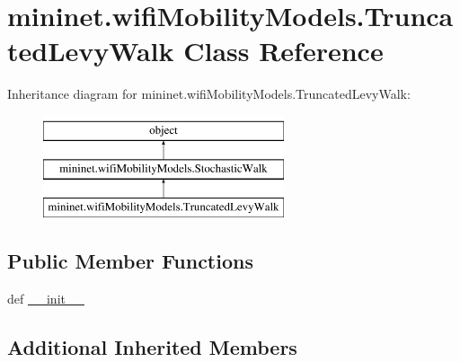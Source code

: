 \hypertarget{classmininet_1_1wifiMobilityModels_1_1TruncatedLevyWalk}{\section{mininet.\-wifi\-Mobility\-Models.\-Truncated\-Levy\-Walk Class Reference}
\label{classmininet_1_1wifiMobilityModels_1_1TruncatedLevyWalk}
}
Inheritance diagram for mininet.\-wifi\-Mobility\-Models.\-Truncated\-Levy\-Walk\-:\begin{figure}[H]
\begin{center}
\leavevmode
\includegraphics[height=3.000000cm]{classmininet_1_1wifiMobilityModels_1_1TruncatedLevyWalk}
\end{center}
\end{figure}
\subsection*{Public Member Functions}
\begin{DoxyCompactItemize}
\item 
def \hyperlink{classmininet_1_1wifiMobilityModels_1_1TruncatedLevyWalk_a63ef49f949e6ececbb962810d272cbf1}{\-\_\-\-\_\-init\-\_\-\-\_\-}
\end{DoxyCompactItemize}
\subsection*{Additional Inherited Members}


